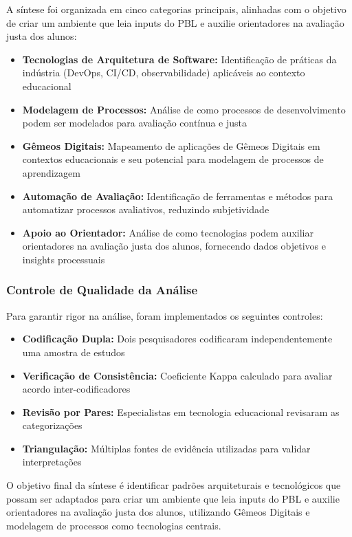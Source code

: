 \documentclass[english, spanish, brazilian]{RBIEarticle} %
\begin{document}
A síntese foi organizada em cinco categorias principais, alinhadas com o objetivo de criar um ambiente que leia inputs do PBL e auxilie orientadores na avaliação justa dos alunos:

\begin{itemize}
\item \textbf{Tecnologias de Arquitetura de Software:} Identificação de práticas da indústria (DevOps, CI/CD, observabilidade) aplicáveis ao contexto educacional
\item \textbf{Modelagem de Processos:} Análise de como processos de desenvolvimento podem ser modelados para avaliação contínua e justa
\item \textbf{Gêmeos Digitais:} Mapeamento de aplicações de Gêmeos Digitais em contextos educacionais e seu potencial para modelagem de processos de aprendizagem
\item \textbf{Automação de Avaliação:} Identificação de ferramentas e métodos para automatizar processos avaliativos, reduzindo subjetividade
\item \textbf{Apoio ao Orientador:} Análise de como tecnologias podem auxiliar orientadores na avaliação justa dos alunos, fornecendo dados objetivos e insights processuais
\end{itemize}

\subsubsection{Controle de Qualidade da Análise}

Para garantir rigor na análise, foram implementados os seguintes controles:
\begin{itemize}
\item \textbf{Codificação Dupla:} Dois pesquisadores codificaram independentemente uma amostra de estudos
\item \textbf{Verificação de Consistência:} Coeficiente Kappa calculado para avaliar acordo inter-codificadores
\item \textbf{Revisão por Pares:} Especialistas em tecnologia educacional revisaram as categorizações
\item \textbf{Triangulação:} Múltiplas fontes de evidência utilizadas para validar interpretações
\end{itemize}

O objetivo final da síntese é identificar padrões arquiteturais e tecnológicos que possam ser adaptados para criar um ambiente que leia inputs do PBL e auxilie orientadores na avaliação justa dos alunos, utilizando Gêmeos Digitais e modelagem de processos como tecnologias centrais.
\end{document}
